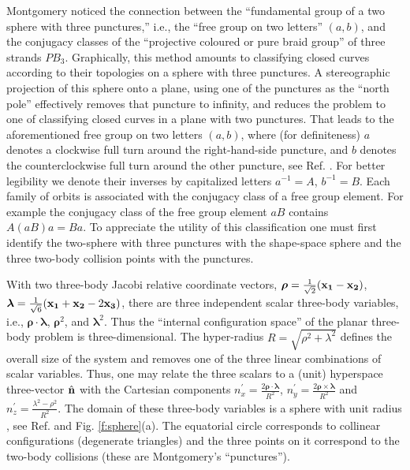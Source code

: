 \documentclass[twocolumn,showpacs,showkeys,preprintnumbers,amsmath,amssymb]{revtex4}
\def\bfgrk #1{\mbox{\boldmath$#1$}}
\begin{document}

Montgomery \cite{Montgomery1998} noticed the connection between the 
``fundamental group of a two sphere with three punctures,'' i.e., 
the ``free group on two letters'' $(a,b)$, and the conjugacy classes 
of the ``projective coloured or pure braid group'' of three strands $PB_3$. 
Graphically, this method amounts to classifying closed curves according to 
their topologies on a sphere with three punctures. A stereographic projection of
this sphere onto a plane, using one of the punctures as the ``north pole'' 
effectively removes that puncture to infinity, and reduces the problem to one 
of classifying closed curves in a plane with two punctures. That leads to the 
aforementioned free group on two letters $(a,b)$, where (for definiteness) 
$a$ denotes a clockwise full turn around the right-hand-side puncture, 
and $b$ denotes the counterclockwise full turn around the other puncture, see Ref. 
\cite{Suvakov:2012b}. 
For better legibility we denote their inverses by capitalized letters $a^{-1}=A$, 
$b^{-1}=B$. Each family of orbits is associated with the conjugacy class of 
a free group element. For example the conjugacy class of the free group element 
$aB$ contains $A(aB)a = Ba$. 
To appreciate the utility of this classification one must first identify the 
two-sphere with three punctures with the shape-space sphere 
and the three two-body collision points with the punctures. 


With two three-body Jacobi relative coordinate vectors,
${\bfgrk \rho} = \frac{1}{\sqrt{2}}({\bf x_1} - {\bf x_2})$, 
${\bfgrk \lambda} = \frac{1}{\sqrt{6}}({\bf x_1} + {\bf x_2} - 
2 {\bf x_3})$,
there are three independent scalar three-body variables, i.e., 
${\bm \rho} \cdot {\bm \lambda}$, ${\bm \rho}^2$, and ${\bm
\lambda}^2$. Thus the ``internal configuration space'' of the 
planar three-body problem is three-dimensional. The hyper-radius 
$R = \sqrt{\rho^{2} + \lambda^{2}}$ 
defines the overall size of the system and removes one of 
the three linear combinations of scalar variables. Thus,
one may relate the three scalars to a (unit) hyperspace 
three-vector ${\hat {\bf n}}$ with the Cartesian components 
$n_x^{'} = \frac{2 {\bm \rho} \cdot {\bm \lambda}}{R^2}$, 
$n_y^{'} = \frac{2 {\bm \rho} \times {\bm \lambda}}{R^2}$ 
and $n_z^{'} = \frac{\lambda^2 - \rho^2}{R^2}$. 
The domain of these three-body variables is a sphere with
unit radius \cite{Iwai1987a}, see Ref. \cite{Suvakov:2012b} 
and Fig. \ref{f:sphere}(a). The equatorial circle corresponds
to collinear configurations (degenerate triangles) and the 
three points on it correspond to the two-body collisions 
(these are Montgomery's ``punctures'').  
\end{document}
